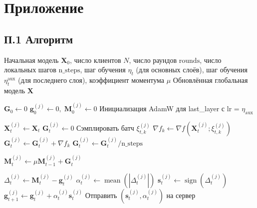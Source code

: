 \documentclass{article}
\begin{document}


\newpage
\section*{Приложение}
\subsection*{П.1 Алгоритм}
\begin{algorithm}[H]
\caption{Federated EF21-Muon}
\begin{algorithmic}[1]
\Require Начальная модель $\mathbf{X}_0$, число клиентов $N$, число раундов $\mathrm{rounds}$, число локальных шагов $\mathrm{n\_steps}$, шаг обучения $\eta_t$ (для основных слоёв), шаг обучения $\eta_t^{\text{aux}}$ (для последнего слоя), коэффициент моментума $\mu$
\Ensure Обновлённая глобальная модель $\mathbf{X}$

\State $\mathbf{G}_0 \gets 0$ 
    \State $\mathbf{g}_0^{(j)} \gets 0, \; \mathbf{M}_0^{(j)} \gets 0$ 
\EndFor
\State Инициализация AdamW для last\_layer с lr = $\eta_{\mathrm{aux}}$

     
        \State $\mathbf{X}_t^{(j)} \gets \mathbf{X}_t$ 
        \State $\mathbf{G}_t^{(j)} \gets 0$
            \State Сэмплировать батч $\xi_{t,k}^{(j)}$
            \State $\nabla f_k \gets \nabla f(\mathbf{X}_t^{(j)}; \xi_{t,k}^{(j)})$
            \State $\mathbf{G}_t^{(j)} \gets \mathbf{G}_t^{(j)} + \nabla f_k$
        \EndFor
        \State $\mathbf{G}_t^{(j)} \gets \mathbf{G}_t^{(j)} / \mathrm{n\_steps}$ 
        
        \State $\mathbf{M}_t^{(j)} \gets \mu \mathbf{M}_{t-1}^{(j)} + \mathbf{G}_t^{(j)}$ 
        
            \State $\Delta_t^{(j)} \gets \mathbf{M}_t^{(j)} - \mathbf{g}_t^{(j)}$ 
            \State $\alpha_t^{(j)} \gets \operatorname{mean}(|\Delta_t^{(j)}|)$ 
            \State $\mathbf{s}_t^{(j)} \gets \operatorname{sign}(\Delta_t^{(j)})$ 
            \State $\mathbf{g}_{t+1}^{(j)} \gets \mathbf{g}_t^{(j)} + \alpha_t^{(j)} \mathbf{s}_t^{(j)}$ 
            \State Отправить $(\mathbf{s}_t^{(j)}, \alpha_t^{(j)})$ на сервер
        \EndFor
        

\end{algorithmic}
\end{algorithm}
\end{document}

